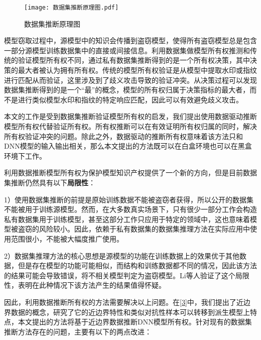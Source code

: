 \begin{figure}[htbp]%
	\centering
	\setlength{\abovecaptionskip}{3mm} %
	\vspace{-2mm}
	\setlength{\belowcaptionskip}{-3mm} %
	\texttt{[image: 数据集推断原理图.pdf]}
	\caption{数据集推断原理图}
	\label{数据集推断原理图}
	\end {figure}	
	
模型窃取过程中，源模型中的知识会传播到盗窃模型，使得所有盗窃模型总是包含一部分源模型训练数据集中的直接或间接信息。利用数据集做模型所有权推测和传统的验证模型所有权不同，通过私有数据集推断得到的是一个所有权决策，其中决策的最大者被认为拥有所有权。传统的模型所有权验证是从模型中提取水印或指纹进行匹配从而验证，这里涉及到了歧义攻击导致的验证冲突。从决策过程可以发现数据集推断得到的是一个“最”的概念，模型的所有权归属于决策指标的最大者，而不是进行类似模型水印和指纹的特定响应匹配，因此可以有效避免歧义攻击。

本文的工作是受到数据集推断验证模型所有权的启发，我们提出使用数据驱动推断模型所有权代替验证所有权。所有权推断可以在有效证明所有权归属的同时，解决所有权验证冲突的问题。除此之外，数据驱动的推断所有权意味着该方法只和DNN模型的输入输出相关，那么本文提出的方法既可以在白盒环境也可以在黑盒环境下工作。

利用数据推断模型所有权为保护模型知识产权提供了一个新的方向，但是目前数据集推断仍然具有以下\textbf{局限性}：

1）使用数据集推断的前提是原始训练数据不能被盗窃者获得，所以公开的数据集不能被用于训练源模型。然而，在大多数真实场景下，只有很少一部分工作会构造私有数据集用于训练模型，甚至这部分工作只应用于特定的领域中，这也意味着模型被盗窃的风险较小。因此，依赖于私有数据集的数据集推理方法在实际应用中使用范围很小，不能被大幅度推广使用。

2）数据集推理方法的核心思想是源模型的功能在训练数据上的效果优于其他数据，但是存在模型的功能可能相似，而结构和训练数据都不同的情况，因此该方法的结果可能会导致错误，将不相关模型判定为盗窃模型。Li等人\cite{lao2022deepauth}验证了这个局限性，表明在此种情况下该方法产生的结果值得怀疑。


因此，利用数据推断所有权的方法需要解决以上问题。在\ref{3}中，我们提出了近边界数据的概念，研究了它的近边界特性和类似对抗性样本可以转移到派生模型上特点，本文提出的方法将基于近边界数据推断DNN模型所有权。针对现有的数据集推断方法存在的问题，主要有以下的两点改进：

